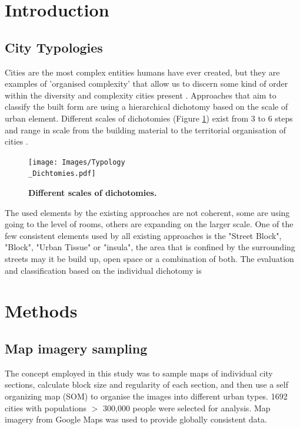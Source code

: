\documentclass{nature}
\begin{document}
\section{Introduction}\label{sec:introduction}


\subsection{City Typologies}\label{sec:introduction2}
Cities are the most complex entities humans have ever created, but they are examples of 'organised complexity' that allow us to discern some kind of order within the diversity and complexity cities present \cite{Kropf2014}. Approaches that aim to classify the built form are using a hierarchical dichotomy based on the scale of urban element. Different scales of dichotomies (Figure \ref{fig:TypologyDichtomies}) exist from 3 to 6 steps and range in scale from the building material to the territorial organisation of cities \cite{Lynch1981,Conzen1960,Caniggi1979,Castex1980,Mouden1988,Allain2004}.



\begin{figure}
\centering    
\texttt{[image: Images/Typology\\\_Dichtomies.pdf]}  
\caption{\bf Different scales of dichotomies. }    
 \label{fig:TypologyDichtomies}  
\end{figure} 



The used elements by the existing approaches are not coherent, some are using going to the level of rooms, others are expanding on the larger scale. One of the few consistent elements used by all existing approaches is the "Street Block", "Block", "Urban Tissue" or "insula", the area that is confined by the surrounding streets may it be build up, open space or a combination of both.
The evaluation and classification based on the individual dichotomy is 



\section{Methods}\label{sec:Methods}

\subsection{Map imagery sampling}\label{sec:methods2}
The concept employed in this study was to sample maps of individual city sections, calculate block size and regularity of each section, and then use a self organizing map (SOM) to organise the images into different urban types. 1692 cities with populations $>$ 300,000 people \cite{UN2014} were selected for analysis. Map imagery from Google Maps \cite{GoogleStatic2017} was used to provide globally consistent data. 
\end{document}
